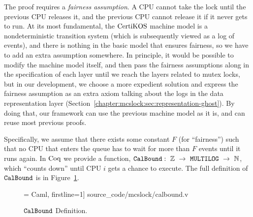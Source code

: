 The proof requires a \emph{fairness assumption}.
A CPU cannot take the lock until the previous CPU releases it, 
and the previous CPU cannot release it if it never gets to run. 
At its most fundamental, the $\mathrm{CertiKOS}$ machine model is a nondeterministic 
transition system (which is subsequently viewed as a log of events), 
and there is nothing in the basic model that ensures fairness, 
so we have to add an extra assumption somewhere. In principle, it would be 
possible to modify the machine model itself, and then pass the fairness assumptions 
along in the specification of each layer until we reach the layers related to mutex locks, 
but in our development, we choose a more expedient solution and express
the fairness assumption as an extra axiom talking about the logs 
in the data representation layer (Section~\ref{chapter:mcslock:sec:representation-ghost}). 
By doing that, our framework can use the previous machine 
model as it is, and can reuse most previous proofs.

Specifically, we assume that there exists some constant $F$ (for ``fairness'') such that no CPU that enters the queue has to wait for more than $F$ events until it runs again. 
In $\mathrm{Coq}$ we provide a function, $\CalBound:\ \ztype\ \rightarrow\ \lockmultilog\ \rightarrow \ \nattype$,
which ``counts down'' 
until CPU $i$ gets a chance to 
execute. 
The full definition of ${\mathrm{\texttt{CalBound}}}$ is in Figure~\ref{fig:chapter:mcslock:calbound-definition}.


\begin{figure}
\begin{center}
 = Caml, firstline=1] {source_code/mcslock/calbound.v}
\end{center}
\caption{${\mathrm{\texttt{CalBound}}}$ Definition.}
\label{fig:chapter:mcslock:calbound-definition}
\end{figure}

